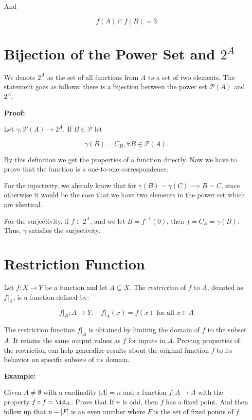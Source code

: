 And

\[
	f(A) \cap f(B) = 3
\]

\section{Bijection of the Power Set and \texorpdfstring{\(2^A\)}{}}

We denote \(2^A\) as the set of all functions from \(A\) to a set of two elements.
The statement goes as follows: there is a bijection between the power set \(\mathcal{P}(A)\) and
\(2^A\).

\textbf{Proof:}

Let \(\gamma: \mathcal{P}(A) \to 2^A\). If \(B \in \mathcal{P}\) let

\[
	\gamma (B) = C_B, \forall B \in \mathcal{P}(A).
\]

By this definition we get the properties of a function directly. Now we have to prove that
the function is a one-to-one correspondence.

For the injectivity, we already know that for \(\gamma(B) = \gamma(C) \implies B = C\), since otherwise it would be the case
that we have two elements in the power set which are identical.

For the surjectivity, if \(f \in 2^A\), and we let \(B = f^{-1}(0)\), then \(f = C_B = \gamma(B)\). Thus,
\(\gamma\) satisfies the surjectivity.

\QED

\section{Restriction Function}

Let \(f: X \to Y\) be a function and let \(A \subseteq X\). The \emph{restriction} of \(f\) to \(A\), denoted as \(f|_A\), is a function defined by:

\[
	f|_A: A \to Y, \quad f|_A(x) = f(x) \text{ for all } x \in A
\]

The restriction function \(f|_A\) is obtained by limiting the domain of \(f\) to the subset \(A\). It retains the same output values as \(f\) for inputs in \(A\).
Proving properties of the restriction can help generalize results about the original function \(f\) to its behavior on specific subsets of its domain.

\textbf{Example:}

Given \(A \neq \emptyset\) with a cardinality \(|A| = n\) and a function \(f: A \to A\) with the property  \(f \circ f = \id_{A}\). Prove that If \(n\) is odd, then \(f\)
has a fixed point. And then follow up that \(n - |F|\) is an even number where \(F\) is the set of fixed points of \(f\).

